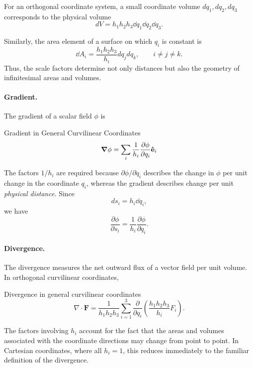 		For an orthogonal coordinate system, a small coordinate volume
		$dq_1,dq_2,dq_3$ corresponds to the physical volume
		\[
			dV
			=
			h_1h_2h_3\dd{q_1}\dd{q_2}\dd{q_3}.
		\]

		Similarly, the area element of a surface on which $q_i$ is constant is
		\[
			\dd{A_i}
			=
			\frac{h_1h_2h_3}{h_i} dq_j dq_k,
			\qquad i\neq j\neq k.
		\]
		Thus, the scale factors determine not only distances but also the geometry of infinitesimal areas and volumes.

		\paragraph{Gradient.}

			The gradient of a scalar field $\phi$ is
			\begin{definition}{Gradient in General Curvilinear Coordinates}
				\begin{equation}
					\grad\phi
					=
					\sum_i
					\frac{1}{h_i}
					\pdv{\phi}{q_i}
					\vu{e}_i
				\end{equation}
			\end{definition}

			The factors $1/h_i$ are required because $\partial\phi/\partial q_i$ describes the change in $\phi$ per unit change in the coordinate $q_i$, whereas the gradient describes change per unit \textit{physical distance}. Since
			\[
				ds_i=h_i\dd{q_i},
			\]
			we have
			\[
				\frac{\partial\phi}{\partial s_i}
				=
				\frac{1}{h_i}
				\frac{\partial\phi}{\partial q_i}.
			\]

		\paragraph{Divergence.}

			The divergence measures the net outward flux of a vector field per unit volume. In orthogonal curvilinear coordinates,
			\begin{definition}{Divergence in general curvilinear coordinates}
			\begin{equation}\label{eq:div_general}
				\nabla\cdot\mathbf F
				=
				\frac{1}{h_1h_2h_3}
				\sum_{i=1}^3
				\frac{\partial}{\partial q_i}
				\left(
				\frac{h_1h_2h_3}{h_i}F_i
				\right).
			\end{equation}
			\end{definition}

			The factors involving $h_i$ account for the fact that the areas and volumes associated with the coordinate directions may change from point to point. In Cartesian coordinates, where all $h_i=1$, this reduces immediately to 
			the familiar definition of the divergence.
			\newpage

